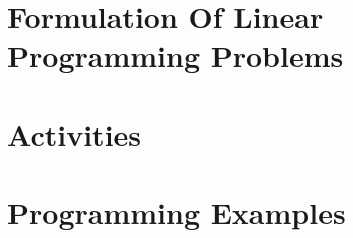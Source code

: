 \documentclass[../main.tex]{subfiles}
\begin{document}
\section{Formulation Of Linear Programming Problems}
\label{sec:model-examples}




% 
%
%
%
%









\section{Activities}
\label{sec:activities}








\section{Programming Examples}
\label{sec:programming}

\begin{framecode}{}{}
  
\end{framecode}
\begin{framecode}{}{}
  
\end{framecode}
\begin{framecode}{}{}
  
\end{framecode}
\begin{frame}
  \maketitle
\end{frame}
\end{document}
